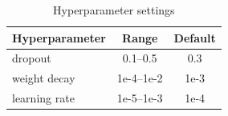 \begin{table}[htbp]
\centering
\caption{Hyperparameter settings}
\label{tab:hparams}
\begin{tabular}{lcc}
\toprule
Hyperparameter & Range & Default \\
\midrule
dropout & 0.1--0.5 & 0.3 \\
weight decay & 1e-4--1e-2 & 1e-3 \\
learning rate & 1e-5--1e-3 & 1e-4 \\
\bottomrule
\end{tabular}
\end{table}
